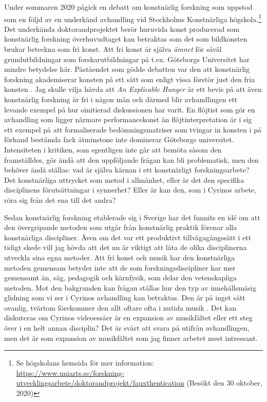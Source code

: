 \documentclass[11pt]{article}
\begin{document}
Under sommaren 2020 pågick en debatt om konstnärlig forskning som uppstod som en följd av en underkänd avhandling vid Stockholms Konstnärliga högskola.\footnote{Se högskolans hemsida för mer information: \url{https://www.uniarts.se/forskning-utvecklingsarbete/doktorandprojekt/fauxthentication} (Besökt den 30 oktober, 2020)} Det underkända doktorandprojektet berör huruvida konst producerad som konstnärlig forskning överhuvudtaget kan betraktas som det som bildkonsten brukar beteckna som fri konst. Att fri konst är själva \emph{ämnet} för såväl grundutbildningar som forskarutbildningar på t.ex. Göteborgs Universitet har mindre betydelse här. Påståendet som gödde debatten var den att konstnärlig forskning akademiserar konsten på ett sätt som enligt vissa förstör just den fria konsten \citep[se till exempel ]{petersson2020}. Jag skulle vilja hävda att \emph{An Explicable Hunger} är ett bevis på att även konstnärlig forskning är fri i någon mån och därmed blir avhandlingen ett levande exempel på hur oinitierad diskussionen har varit. En flöjtist som gör en avhandling som ligger närmare performancekonst än flöjtinterpretation är i sig ett exempel på att formaliserade bedömningsmatriser som tvingar in konsten i på förhand bestämda fack åtminstone inte dominerar Göteborgs universitet. Intensiteten i kritiken, som egentligen inte går att bemöta såsom den framställdes, gör ändå att den uppföljande frågan kan bli problematisk, men den behöver ändå ställas: vad är själva kärnan i ett konstnärligt forskningsarbete? Det konstnärliga uttrycket som metod i allmänhet, eller är det den specifika disciplinens förutsättningar i synnerhet? Eller är kan den, som i Cyrinos arbete, röra sig från det ena till det andra?

Sedan konstnärlig forskning etablerade sig i Sverige har det funnits
en idé om att den övergripande metoden som utgår från konstnärlig
praktik förenar alla konstnärliga discipliner. Även om det var ett
produktivt tillvägagångssätt i ett tidigt skede vill jag hövda att det
nu är viktigt att låta de olika disciplinerna utveckla sina egna
metoder. Att fri konst och musik har den konstnärliga metoden gemensam
betyder inte att de som forskningsdiscipliner har mer gemensamt än,
säg, pedagogik och kärnfysik, som delar den vetenskapliga metoden. Mot
den bakgrunden kan frågan ställas hur den typ av innehållsmäsig
glidning som vi ser i Cyrinos avhandling kan betraktas. Den är på
inget sätt ovanlig, tvärtom förekommer den allt oftare ofta i nutida
musik \citep{groth2016}. Det kan diskuteras om Cyrinos videoessäer är en
expansion av musikfältet eller ett steg över i en helt annan
disciplin? Det är svårt att svara på utifrån avhandlingen, men det är
som expansion av musikfältet som jag finner arbetet mest intressant.

\printbibliography[title=\{Referenser\}]
\end{document}
